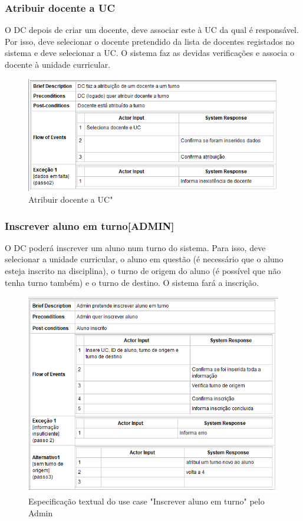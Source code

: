 \documentclass[a4paper]{article}
\begin{document}
\subsubsection{Atribuir docente a UC}
\hspace{3mm}O DC depois de criar um docente, deve associar este à UC da qual é responsável. Por isso, deve selecionar o docente pretendido da lista de docentes registados no sistema e deve selecionar a UC. O sistema faz as devidas verificações e associa o docente à unidade curricular.

\begin{figure}[H]
\centering
\includegraphics[width=14cm]{UCAtribuirDocenteAUcADMIN}
\caption{Atribuir docente a UC"}
\label{}
\end{figure}

\subsubsection{Inscrever aluno em turno[ADMIN]}
\hspace{3mm}O DC poderá inscrever um aluno num turno do sistema. Para isso, deve selecionar a unidade curricular, o aluno em questão (é necessário que o aluno esteja inscrito na disciplina), o turno de origem do aluno (é possível que não tenha turno também) e o turno de destino. O sistema fará a inscrição.


\begin{figure}[H]
\centering
\includegraphics[width=14cm]{UCInscreverAlunoEmTurnoADMIN}
\caption{Especificação textual do use case "Inscrever aluno em turno" pelo Admin}
\label{}
\end{figure}
\end{document}
